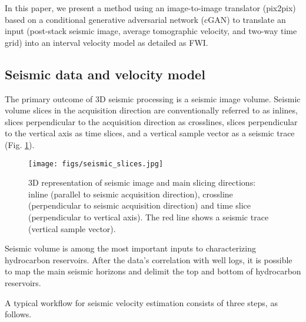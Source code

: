 \documentclass[conference]{IEEEtran}
\newcommand{\avelino}[1]{\textcolor{yellow}{#1}}
\begin{document}
In this paper, we present a method using an image-to-image translator (pix2pix)\cite{isola2018imagetoimage} based on a conditional generative adversarial network (cGAN) to translate an input (post-stack seismic image, average tomographic velocity, and two-way time grid) into an interval velocity model as detailed as FWI.

\subsection{Seismic data and velocity model}

The primary outcome of 3D seismic processing is a seismic image volume. Seismic volume slices in the acquisition direction are conventionally referred to as inlines, slices perpendicular to the acquisition direction as crosslines, slices perpendicular to the vertical axis as time slices, and a vertical sample vector as a seismic trace (Fig. \ref{fig:Seismic_Volume}).

\begin{figure}[h]
     \centering
     \texttt{[image: figs/seismic\_slices.jpg]}
      \caption{3D representation of seismic image and main slicing directions: inline (parallel to seismic acquisition direction), crossline (perpendicular to seismic acquisition direction) and time slice (perpendicular to vertical axis). The red line shows a seismic trace (vertical sample vector). }%
     \label{fig:Seismic_Volume}
\end{figure}

Seismic volume is among the most important inputs to characterizing hydrocarbon reservoirs. After  the data’s correlation with well logs, it is possible to map the main seismic horizons and delimit the top and bottom of hydrocarbon reservoirs.

A typical workflow for seismic velocity estimation consists of three steps, as follows.
\end{document}
